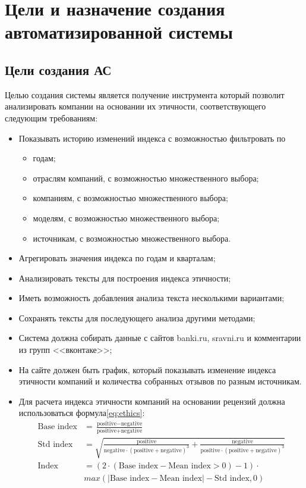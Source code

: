 {\section{Цели и назначение создания автоматизированной системы}

\subsection{Цели создания АС}
Целью создания системы является получение инструмента который позволит анализировать компании на основании их этичности, соответствующего следующим требованиям:
\begin{itemize}
  \item Показывать историю изменений индекса с возможностью фильтровать по
        \begin{itemize}
          \item годам;
          \item отраслям компаний, с возможностью множественного выбора;
          \item компаниям, с возможностью множественного выбора;
          \item моделям, с возможностью множественного выбора;
          \item источникам, с возможностью множественного выбора.
        \end{itemize}
  \item Агрегировать значения индекса по годам и кварталам;
  \item Анализировать тексты для построения индекса этичности;
  \item Иметь возможность добавления анализа текста несколькими вариантами;
  \item Сохранять тексты для последующего анализа другими методами;
  \item Система должна собирать данные с сайтов banki.ru, sravni.ru и комментарии из групп {}<<вконтаке>>{};
  \item На сайте должен быть график, который показывать изменение индекса этичности компаний и количества собранных отзывов по разным источникам.
  \item Для расчета индекса этичности компаний на основании рецензий должна использоваться формула\ref{eq:ethics}:
        \begin{equation}
          \label{eq:ethics}
          \begin{aligned}
            \text{Base index} &= \frac{\text{positive} - \text{negative}}{\text{positive} + \text{negative}} \\
            \text{Std index} &= \sqrt{\frac{\text{positive}}{\text{negative} \cdot (\text{positive} + \text{negative})^{3}} + \frac{\text{negative}}{\text{positive} \cdot (\text{positive} + \text{negative})^{3}}} \\
            \text{Index} &= ({2\cdot({\text{Base index}}-{\text{Mean index}} > 0) - 1})\cdot\\
                              &{max\left(\left|{\text{Base index}}-{\text{Mean index}}\right|-{\text{Std index}}, 0\right)}
          \end{aligned}
        \end{equation}


\end{itemize}}
